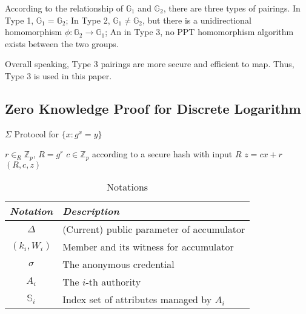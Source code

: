 \documentclass[journal]{IEEEtran}
\begin{document}
According to the relationship of $\mathbb{G}_1$ and $\mathbb{G}_2$, there are three types of pairings. 
In Type 1, $\mathbb{G}_1 = \mathbb{G}_2$; In Type 2, $\mathbb{G}_1 \neq \mathbb{G}_2$, but there is a unidirectional homomorphism $\phi:\mathbb{G}_2 \rightarrow \mathbb{G}_1$; An in Type 3, no PPT homomorphism algorithm exists between the two groups.

Overall speaking, Type 3 pairings are more secure and efficient to map. Thus, Type 3 is used in this paper.

\subsection{Zero Knowledge Proof for Discrete Logarithm}

\begin{algorithm}[h]
	\caption{$\Sigma$ Protocol for $\{x: g^x = y\}$}\label{alg:dlproof}
	\begin{algorithmic}[1]
		\STATE $r\in_R\mathbb{Z}_p$, $R = g^r$ 
		\STATE $c\in \mathbb{Z}_p $ according to a secure hash with input $R$
		\STATE $z = cx + r$
		\RETURN $(R, c, z)$
	\end{algorithmic}
\end{algorithm}

	\begin{table}[h]
		\caption{Notations}
		\label{table:notate}
		\centering
		\begin{tabular}{c|l}
			\hline
			\emph{Notation} & \emph{Description}\\
			\hline
			$\Delta$ & (Current) public parameter of accumulator\\
			$(k_i, W_i)$ & Member and its witness for accumulator\\
			$\sigma$ & The anonymous credential\\
			$A_i$ & The $i$-th authority\\
			$\mathbb{S}_i$ & Index set of attributes managed by $A_i$\\
		\end{tabular}
	\end{table}
	
	
\end{document}
